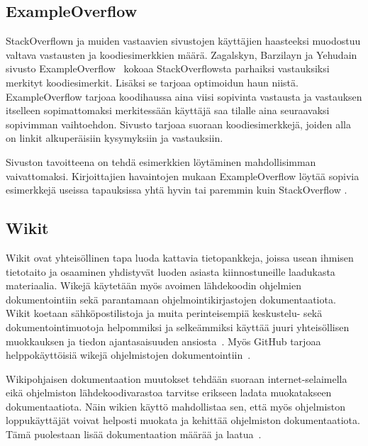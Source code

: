 \documentclass[finnish]{tktltiki2}
\theoremstyle{definition}
\theoremstyle{remark}
\begin{document}
\subsection{ExampleOverflow}
\label{ch:exampleoverflow}

StackOverflown ja muiden vastaavien sivustojen käyttäjien haasteeksi muodostuu valtava vastausten ja koodiesimerkkien määrä. Zagalskyn, Barzilayn ja Yehudain sivusto ExampleOverflow~\cite{example-overflow-social-media-for-code-recommendations} kokoaa StackOverflowsta parhaiksi vastauksiksi merkityt koodiesimerkit. Lisäksi se tarjoaa optimoidun haun niistä. ExampleOverflow tarjoaa koodihaussa aina viisi sopivinta vastausta ja vastauksen itselleen sopimattomaksi merkitessään käyttäjä saa tilalle aina seuraavaksi sopivimman vaihtoehdon. Sivusto tarjoaa suoraan koodiesimerkkejä, joiden alla on linkit alkuperäisiin kysymyksiin ja vastauksiin.

Sivuston tavoitteena on tehdä esimerkkien löytäminen mahdollisimman vaivattomaksi. Kirjoittajien havaintojen mukaan ExampleOverflow löytää sopivia esimerkkejä useissa tapauksissa yhtä hyvin tai paremmin kuin StackOverflow \cite{example-overflow-social-media-for-code-recommendations}.

\subsection{Wikit}
\label{ch:wiki}
Wikit ovat yhteisöllinen tapa luoda kattavia tietopankkeja, joissa usean ihmisen tietotaito ja osaaminen yhdistyvät luoden asiasta kiinnostuneille laadukasta materiaalia. Wikejä käytetään myös avoimen lähdekoodin ohjelmien dokumentointiin sekä parantamaan ohjelmointikirjastojen dokumentaatiota. Wikit koetaan sähköpostilistoja ja muita perinteisempiä keskustelu- sekä dokumentointimuotoja helpommiksi ja selkeämmiksi käyttää juuri yhteisöllisen muokkauksen ja tiedon ajantasaisuuden ansiosta~\cite{using-wikis-in-sw}.
Myös GitHub tarjoaa helppokäyttöisiä wikejä ohjelmistojen dokumentointiin~\cite{github-wiki}.

Wikipohjaisen dokumentaation muutokset tehdään suoraan internet-selaimella eikä ohjelmiston lähdekoodivarastoa tarvitse erikseen ladata muokatakseen dokumentaatiota. Näin wikien käyttö mahdollistaa sen, että myös ohjelmiston loppukäyttäjät voivat helposti muokata ja kehittää ohjelmiston dokumentaatiota. Tämä puolestaan lisää dokumentaation määrää ja laatua~\cite{wiki-social-knowledge-construction}.

\end{document}
